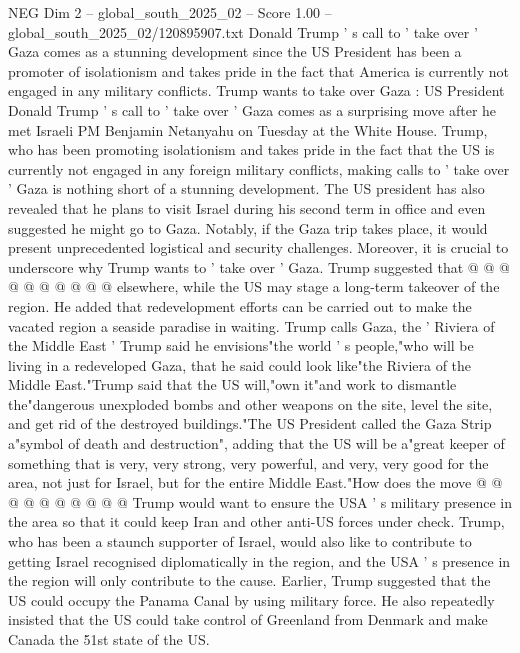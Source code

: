 \begin{textsample}{NEG Dim 2 – global\_south\_2025\_02 – Score 1.00 – global\_south\_2025\_02/120895907.txt}  \label{ex:f2_neg_026}
Donald Trump ' s call to ' take over ' Gaza comes as a stunning development since the US President has been a promoter of isolationism and takes pride in the fact that America is currently not engaged in any military conflicts.
Trump wants to take over Gaza : US President Donald Trump ' s call to ' take over ' Gaza comes as a surprising move after he met Israeli PM Benjamin Netanyahu on Tuesday at the White House.
Trump, who has been promoting isolationism and takes pride in the fact that the US is currently not engaged in any foreign military conflicts, making calls to ' take over ' Gaza is nothing short of a stunning development.
The US president has also revealed that he plans to visit Israel during his second term in office and even suggested he might go to Gaza.
Notably, if the Gaza trip takes place, it would present unprecedented logistical and security challenges.
Moreover, it is crucial to underscore why Trump wants to ' take over ' Gaza.
Trump suggested that @ @ @ @ @ @ @ @ @ @ elsewhere, while the US may stage a long-term takeover of the region.
He added that redevelopment efforts can be carried out to make the vacated region a seaside paradise in waiting.
Trump calls Gaza, the ' Riviera of the Middle East ' Trump said he envisions"the world ' s people,"who will be living in a redeveloped Gaza, that he said could look like"the Riviera of the Middle East."Trump said that the US will,"own it"and work to dismantle the"dangerous unexploded bombs and other weapons on the site, level the site, and get rid of the destroyed buildings."The US President called the Gaza Strip a"symbol of death and destruction", adding that the US will be a"great keeper of something that is very, very strong, very powerful, and very, very good for the area, not just for Israel, but for the entire Middle East."How does the move @ @ @ @ @ @ @ @ @ @ Trump would want to ensure the USA ' s military presence in the area so that it could keep Iran and other anti-US forces under check.
Trump, who has been a staunch supporter of Israel, would also like to contribute to getting Israel recognised diplomatically in the region, and the USA ' s presence in the region will only contribute to the cause.
Earlier, Trump suggested that the US could occupy the Panama Canal by using military force.
He also repeatedly insisted that the US could take control of Greenland from Denmark and make Canada the 51st state of the US.

\end{textsample}
